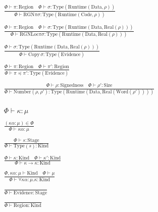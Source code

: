 \documentclass {article}
\begin{document}
\begin{gather*}
\\
\frac
{\Phi \vdash \pi : \text{Region} \quad \Phi \vdash \sigma : \text{Type}(\text{Runtime}(\text{Data}, \rho))}
{\Phi \vdash \text{RGN} \pi \sigma : \text{Type}(\text{Runtime}(\text{Code}, \rho))} \\
\\
\frac
{\Phi \vdash \pi : \text{Region} \quad \Phi \vdash \sigma : \text{Type}(\text{Runtime}(\text{Data}, \text{Real}(\rho)))}
{\Phi \vdash \text{RGNLoc} \pi \sigma : \text{Type}(\text{Runtime} (\text{Data}, \text{Real}(\rho)))} \\
\\
\frac
{\Phi \vdash \sigma : \text{Type}(\text{Runtime}(\text{Data}, \text{Real}(\rho)))}
{\Phi \vdash \text{Copy} \, \sigma : \text{Type}(\text{Evidence})} \\
\\
\frac
{\Phi \vdash \pi : \text{Region} \quad \Phi \vdash \pi' : \text{Region}}
{\Phi \vdash \pi \preceq \pi' : \text{Type}(\text{Evidence})} \\
\\
\frac
{\Phi \vdash \rho : \text{Signedness} \quad \Phi \vdash \rho' : \text{Size}}
{\Phi \vdash \text{Number} (\rho, \rho') : \text{Type} (\text{Runtime} (\text{Data}, \text{Real} (\text{Word} (\rho')))) } \\
\\
\\
\\
\Phi \vdash \kappa : \mu \tag*{[Kind Validation]} \\
\\
\frac
{(\kappa \alpha : \mu) \in \Phi}
{\Phi \vdash \kappa \alpha : \mu } \\
\\
\frac
{\Phi \vdash s : \text{Stage}}
{\Phi \vdash \text {Type} (s) : \text{Kind}} \\
\\
\frac
{\Phi \vdash \kappa : \text{Kind} \quad \Phi \vdash \kappa' : \text{Kind}}
{\Phi \vdash \kappa \to \kappa : \text{Kind} } \\
\\
\frac
{\Phi, \kappa \alpha : \mu \vdash \text{Kind} \quad \Phi \vdash \mu }
{\Phi \vdash \forall \kappa \alpha : \mu. \kappa : \text{Kind}  } \\
\\
\frac
{}
{\Phi \vdash \text{Evidence} : \text{Stage}} \\
\\
\frac
{}
{\Phi \vdash \text{Region} : \text{Kind}} \\

\end{gather*}
\end{document}

